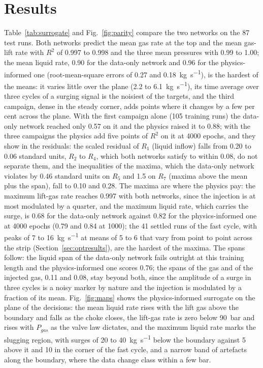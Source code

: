 \documentclass[a4paper,fleqn]{cas-sc}
\begin{document}
\section{Results}\label{sec:results}

Table~\ref{tab:surrogate} and Fig.~\ref{fig:parity} compare the two networks on the 87 test runs. Both networks predict the mean gas rate at the top and the mean gas-lift rate with $R^2$ of 0.997 to 0.998 and the three mean pressures with 0.99 to 1.00; the mean liquid rate, 0.90 for the data-only network and 0.96 for the physics-informed one (root-mean-square errors of 0.27 and \SI{0.18}{\kilogram\per\second}), is the hardest of the means: it varies little over the plane (2.2 to \SI{6.1}{\kilogram\per\second}), its time average over three cycles of a surging signal is the noisiest of the targets, and the third campaign, dense in the steady corner, adds points where it changes by a few per cent across the plane. With the first campaign alone (105 training runs) the data-only network reached only 0.57 on it and the physics raised it to 0.88; with the three campaigns the physics add five points of $R^2$ on it at 4000 epochs, and they show in the residuals: the scaled residual of $R_1$ (liquid inflow) falls from 0.20 to 0.06 standard units, $R_2$ to $R_4$, which both networks satisfy to within 0.08, do not separate them, and the inequalities of the maxima, which the data-only network violates by 0.46 standard units on $R_5$ and 1.5 on $R_7$ (maxima above the mean plus the span), fall to 0.10 and 0.28. The maxima are where the physics pay: the maximum lift-gas rate reaches 0.997 with both networks, since the injection is at most modulated by a quarter, and the maximum liquid rate, which carries the surge, is 0.68 for the data-only network against 0.82 for the physics-informed one at 4000 epochs (0.79 and 0.84 at 1000); the 41 settled runs of the fast cycle, with peaks of 7 to \SI{16}{\kilogram\per\second} at means of 5 to 6 that vary from point to point across the strip (Section~\ref{sec:optresults}), are the hardest of the maxima. The spans follow: the liquid span of the data-only network fails outright at this training length and the physics-informed one scores 0.76; the spans of the gas and of the injected gas, 0.11 and 0.08, stay beyond both, since the amplitude of a surge in three cycles is a noisy marker by nature and the injection is modulated by a fraction of its mean. Fig.~\ref{fig:maps} shows the physics-informed surrogate on the plane of the decisions: the mean liquid rate rises with the lift gas above the boundary and falls as the choke closes, the lift-gas rate is zero below \SI{90}{\bar} and rises with $P_{gas}$ as the valve law dictates, and the maximum liquid rate marks the slugging region, with surges of 20 to \SI{40}{\kilogram\per\second} below the boundary against 5 above it and 10 in the corner of the fast cycle, and a narrow band of artefacts along the boundary, where the data change class within a few bar.
\end{document}
